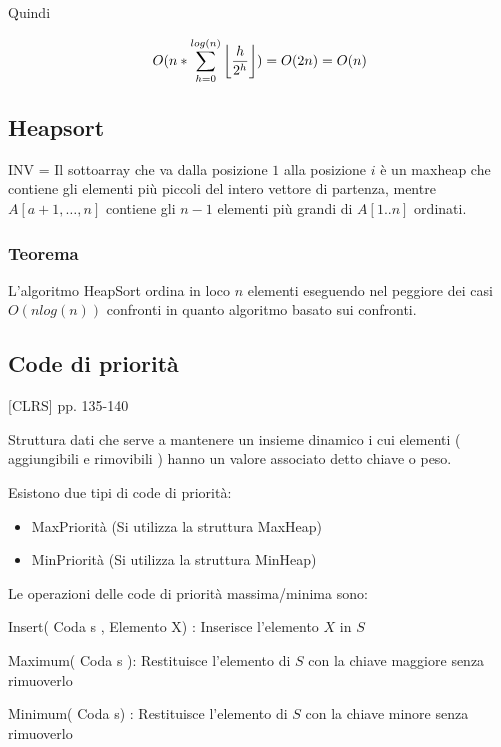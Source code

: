 \documentclass[tikz]{article}
\DeclarePairedDelimiter\floor{\lfloor}{\rfloor}
\providecommand{\tightlist}{%
  \setlength{\itemsep}{0pt}\setlength{\parskip}{0pt}}
\begin{document}
{{Quindi}

\begin{equation}
O(n*\sum_{h=0}^{log(n)}{\floor*{\frac{h}{2^h}}}) = O(2n) = O(n)
\end{equation}

\subsection{Heapsort}



{INV = Il sottoarray che va dalla posizione $1$ alla posizione $i$ è un maxheap che contiene gli elementi più piccoli del intero vettore di partenza, mentre $A[a+1,\ldots,n]$ contiene gli $n-1$ elementi più grandi di $A[1..n]$ ordinati}{.}

\subsubsection{Teorema}

{L'algoritmo HeapSort ordina in loco $n$ elementi eseguendo nel peggiore dei casi $O(nlog(n))$ confronti in quanto algoritmo basato sui confronti.}

\subsection{Code di priorità}

{{[}CLRS{]} pp. 135-140}

{Struttura dati che serve a mantenere un insieme dinamico i cui elementi ( aggiungibili e rimovibili ) hanno un valore associato detto chiave o peso.}

{Esistono due tipi di code di priorità:}

\begin{itemize}
\tightlist
\item
  {MaxPriorità (Si utilizza la struttura MaxHeap)}
\item
  {MinPriorità (Si utilizza la struttura MinHeap)}
\end{itemize}

{Le operazioni delle code di priorità massima/minima sono:}

{Insert( Coda s , Elemento X) : Inserisce l'elemento $X$ in $S$}

{Maximum( Coda s ): Restituisce l'elemento di $S$ con la chiave maggiore senza rimuoverlo}

{Minimum( Coda s) : Restituisce l'elemento di $S$ con la chiave minore senza rimuoverlo}

}
\end{document}
